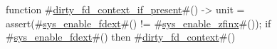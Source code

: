 function #\hyperref[sailRISCVzdirtyzyfdzycontextzyifzypresent]{dirty\_fd\_context\_if\_present}#() -> unit = {
  assert(#\hyperref[sailRISCVzsyszyenablezyfdext]{sys\_enable\_fdext}#() != #\hyperref[sailRISCVzsyszyenablezyzzfinx]{sys\_enable\_zfinx}#());
  if #\hyperref[sailRISCVzsyszyenablezyfdext]{sys\_enable\_fdext}#() then #\hyperref[sailRISCVzdirtyzyfdzycontext]{dirty\_fd\_context}#()
}
